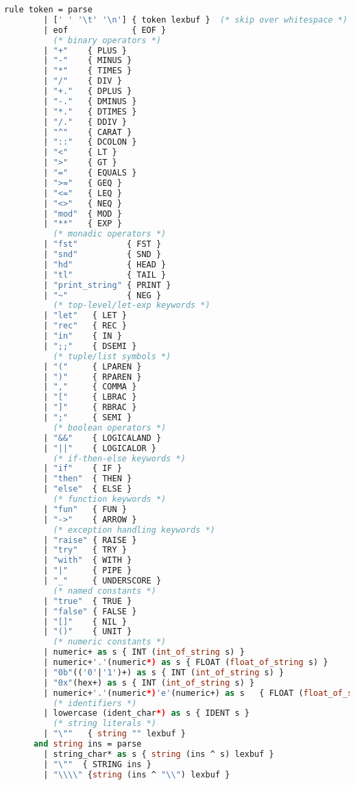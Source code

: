 \begin{lstlisting}[language=Caml, caption=tailRecPicoMLlex.mll]
      rule token = parse
        | [' ' '\t' '\n'] { token lexbuf }  (* skip over whitespace *)
        | eof             { EOF }
          (* binary operators *)
        | "+"    { PLUS }
        | "-"    { MINUS }
        | "*"    { TIMES }
        | "/"    { DIV }
        | "+."   { DPLUS }
        | "-."   { DMINUS }
        | "*."   { DTIMES }
        | "/."   { DDIV }
        | "^"    { CARAT }
        | "::"   { DCOLON }
        | "<"    { LT }
        | ">"    { GT }
        | "="    { EQUALS }
        | ">="   { GEQ }
        | "<="   { LEQ }
        | "<>"   { NEQ }
        | "mod"  { MOD }
        | "**"   { EXP }
          (* monadic operators *)
        | "fst"          { FST }
        | "snd"          { SND }
        | "hd"           { HEAD }
        | "tl"           { TAIL }
        | "print_string" { PRINT }
        | "~"            { NEG }
          (* top-level/let-exp keywords *)
        | "let"   { LET }
        | "rec"   { REC }
        | "in"    { IN }
        | ";;"    { DSEMI }
          (* tuple/list symbols *)
        | "("     { LPAREN }
        | ")"     { RPAREN }
        | ","     { COMMA }
        | "["     { LBRAC }
        | "]"     { RBRAC }
        | ";"     { SEMI }
          (* boolean operators *)
        | "&&"    { LOGICALAND }
        | "||"    { LOGICALOR }
          (* if-then-else keywords *)
        | "if"    { IF }
        | "then"  { THEN }
        | "else"  { ELSE }
          (* function keywords *)
        | "fun"   { FUN }
        | "->"    { ARROW }
          (* exception handling keywords *)
        | "raise" { RAISE }
        | "try"   { TRY }
        | "with"  { WITH }
        | "|"     { PIPE }
        | "_"     { UNDERSCORE }
          (* named constants *)
        | "true"  { TRUE }
        | "false" { FALSE }
        | "[]"    { NIL }
        | "()"    { UNIT }
          (* numeric constants *)
        | numeric+ as s { INT (int_of_string s) }
        | numeric+'.'(numeric*) as s { FLOAT (float_of_string s) }
        | "0b"(('0'|'1')+) as s { INT (int_of_string s) }
        | "0x"(hex+) as s { INT (int_of_string s) }
        | numeric+'.'(numeric*)'e'(numeric+) as s   { FLOAT (float_of_string s) }
          (* identifiers *)
        | lowercase (ident_char*) as s { IDENT s }
          (* string literals *)
        | "\""   { string "" lexbuf }
      and string ins = parse
        | string_char* as s { string (ins ^ s) lexbuf }
        | "\""  { STRING ins }
        | "\\\\" {string (ins ^ "\\") lexbuf }

\end{lstlisting}
